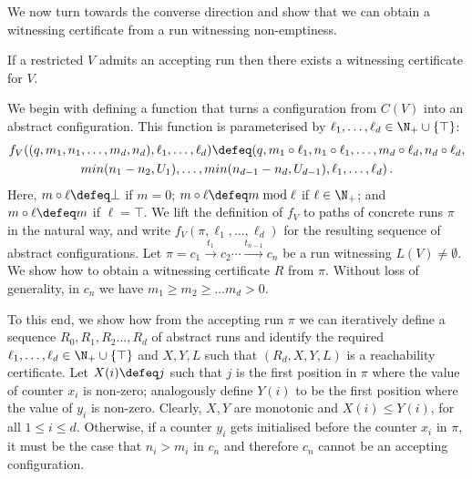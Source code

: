 We now turn towards the converse direction and show that we can obtain
a witnessing certificate from a run witnessing non-emptiness. 
%
\begin{proposition}\label{lem:concrete-to-abstract}
  If a restricted \laVASS $V$ admits an accepting run then
  there exists a witnessing certificate for $V$.
\end{proposition}
%
We begin with defining a function that turns a configuration from
$C(V)$ into an abstract configuration. This function is parameterised
by $\ell_1,\ldots,\ell_d\in \N_+ \cup \{ \top \}$:
%
\begin{multline*}
f_V((q,m_1,n_1,\dots,m_d,n_d),\ell_1,\dots,\ell_d)\defeq 
(q,m_1\circ \ell_1,n_1\circ \ell_1,\dots,m_d\circ \ell_d,n_d\circ \ell_d,\\
min(n_1-n_2,U_1),\dots,min(n_{d-1}-n_{d},U_{d-1}),\ell_1,\dots,\ell_d)\,.
\end{multline*}
%
Here, $m\circ \ell\defeq\bot$ if $m=0$; $m\circ \ell\defeq
m\bmod \ell$ if $\ell\in\N_+$; and $m\circ \ell\defeq m$ if
$\ell=\top$.  We lift the definition of $f_V$ to paths of concrete
runs $\pi$ in the natural way, and write
$f_V(\pi,\ell_1,\dots,\ell_d)$ for the resulting sequence of abstract
configurations. Let $\pi=c_1 \xrightarrow{t_1}
c_2 \cdots \xrightarrow{t_{n-1}} c_n$ be a run witnessing
$L(V)\neq\emptyset$. We show how to obtain a witnessing certificate
$R$ from $\pi$. Without loss of generality, in $c_n$ we have $m_1\ge
m_2 \ge
\ldots m_d>0$.

To this end, we show how from the accepting run $\pi$ we can
iteratively define a sequence $R_0,R_1,R_2\ldots,R_d$ of abstract runs
and identify the required $\ell_1,\ldots, \ell_d \in
\N_+ \cup \{ \top \}$ and $X,Y,L$ such that $(R_d,X,Y,L)$ is a reachability
certificate. Let $X(i)\defeq j$ such that $j$ is the first position in
$\pi$ where the value of counter $x_i$ is non-zero; analogously define
$Y(i)$ to be the first position where the value of $y_i$ is
non-zero. Clearly, $X,Y$ are monotonic and $X(i)\le Y(i)$, for all
$1\le i\le d$. Otherwise, if a counter $y_i$ gets initialised before
the counter $x_i$ in $\pi$, it must be the case that $n_i>m_i$ in
$c_n$ and therefore $c_n$ cannot be an accepting configuration.

